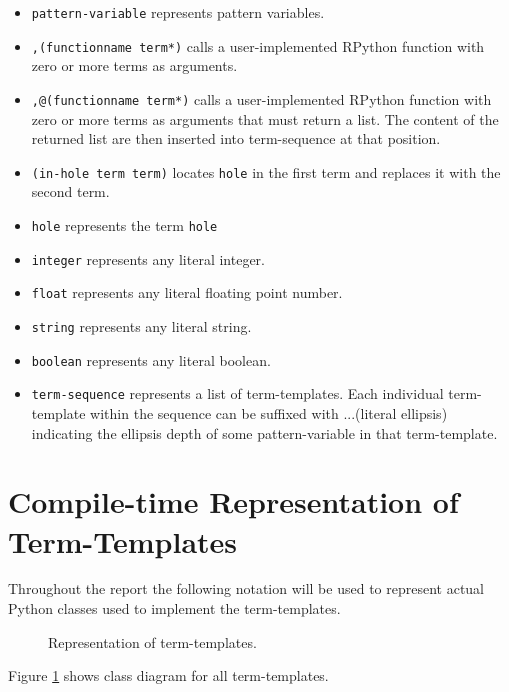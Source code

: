\begin{itemize}
\item
\texttt{pattern-variable} represents pattern variables.
\item
\texttt{,(functionname term*)} calls a user-implemented RPython function with zero or more terms as arguments.
\item
\texttt{,@(functionname term*)} calls a user-implemented RPython function with zero or more terms as arguments that must return a list. The content of the returned list are then inserted into term-sequence at that position.
\item
\texttt{(in-hole term term)} locates \lstinline{hole} in the first term and replaces it with the second term.
\item
\texttt{hole} represents the term \lstinline{hole}
\item
\texttt{integer} represents any literal integer.
\item
\texttt{float} represents any literal floating point number.
\item
\texttt{string}  represents any literal string.
\item
\texttt{boolean}  represents any literal boolean.
\item
\texttt{term-sequence} represents a list of term-templates.  Each individual term-template within the sequence can be suffixed with ...(literal ellipsis) indicating the ellipsis depth of some pattern-variable in that term-template.
\end{itemize}

\section{Compile-time Representation of Term-Templates}

Throughout the report the following notation will be used to represent actual Python classes used to implement the term-templates.

\begin{figure}[H]
	\centering
	\caption{Representation of term-templates.}
\label{class-diagram-termtemplate}
\end{figure}

Figure \ref{class-diagram-termtemplate} shows class diagram for all term-templates.


